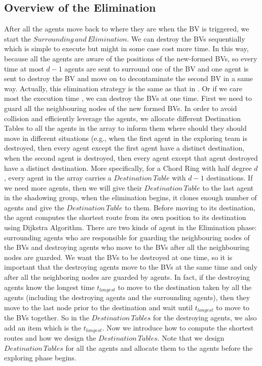 \subsection{Overview of the Elimination}
After all the agents move back to where they are when the BV is triggered, we start the $Surrounding\,and\,Elimination$. We can destroy the BVs sequentially which is simple to execute but might in some case cost more time. In this way, because all the agents are aware of the positions of the new-formed BVs, so every time at most $d-1$ agents are sent to surround one of the BV and one agent is sent to destroy the BV and move on to decontaminate the second BV in a same way. Actually, this elimination strategy is the same as that in \cite{Alotaibi}. Or if we care most the execution time , we can destroy the BVs at one time. First we need to guard all the neighbouring nodes of the new formed BVs. In order to avoid collision and efficiently leverage the agents, we allocate different Destination Tables to all the agents in the array to inform them where should they should move in different situations (e.g., when the first agent in the exploring team is destroyed, then every agent except the first agent have a distinct destination, when the second agent is destroyed, then every agent except that agent destroyed have a distinct destination. More specifically, for a Chord Ring with half degree $d$, every agent in the array carries a $Destination\,Table$ with $d-1$ destinations. If we need more agents, then we will give their $Destination\,Table$ to the last agent in the shadowing group, when the elimination begins, it clones enough number of agents and give the $Destination\, Table$ to them. Before moving to its destination, the agent computes the shortest route from its own position to its destination using Dijkstra Algorithm. There are two kinds of agent in the Elimination phase: surrounding agents who are responsible for guarding the neighbouring nodes of the BVs and destroying agents who move to the BVs after all the neighbouring nodes are guarded. We want the BVs to be destroyed at one time, so it is important that the destroying agents move to the BVs at the same time and only after all the neighboring nodes are guarded by agents. In fact, if the destroying agents know the longest time $t_{longest}$ to move to the destination taken by all the agents (including the destroying agents and the surrounding agents), then they move to the last node prior to the destination and wait until $t_{longest}$ to move to the BVs together. So in the $Destination\,Tables$ for the destroying agents, we also add an item which is the $t_{longest}$. Now we introduce how to compute the shortest routes and how we design the $Destination\,Tables$. Note that we design $Destination\,Tables$ for all the agents and allocate them to the agents before the exploring phase begins.

